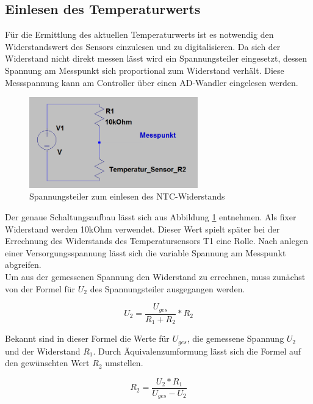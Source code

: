 \subsection{Einlesen des Temperaturwerts}
Für die Ermittlung des aktuellen Temperaturwerts ist es notwendig den Widerstandswert des Sensors einzulesen und zu digitalisieren. Da sich der Widerstand nicht direkt messen lässt wird ein Spannungsteiler eingesetzt, dessen Spannung am Messpunkt sich proportional zum Widerstand verhält. Diese Messspannung kann am Controller über einen AD-Wandler eingelesen werden.

\begin{figure}[h]
\centering
\includegraphics[width=0.65\textwidth]{sensor/temperature_circuit.PNG}
\caption{Spannungsteiler zum einlesen des NTC-Widerstands}
\label{img:temperature_circuit}
\end{figure}

Der genaue Schaltungsaufbau lässt sich aus Abbildung \ref{img:temperature_circuit} entnehmen. Als fixer Widerstand werden 10kOhm verwendet. Dieser Wert spielt später bei der Errechnung des Widerstands des Temperatursensors T1 eine Rolle. Nach anlegen einer Versorgungsspannung lässt sich die variable Spannung am Messpunkt abgreifen. \\
\label{lbl:temp_equation}
Um aus der gemessenen Spannung den Widerstand zu errechnen, muss zunächst von der Formel für $U_{2}$ des Spannungsteiler ausgegangen werden.

\begin{equation}
U_{2} = \frac{U_{ges}}{R_{1} + R_{2}} * R_{2}
\end{equation}

Bekannt sind in dieser Formel die Werte für $U_{ges}$, die gemessene Spannung $U_{2}$ und der Widerstand $R_{1}$. Durch Äquivalenzumformung lässt sich die Formel auf den gewünschten Wert $R_{2}$ umstellen.

\begin{equation}
R_{2} = \frac{U_{2} * R_{1}}{U_{ges} - U_{2}}
\end{equation}

